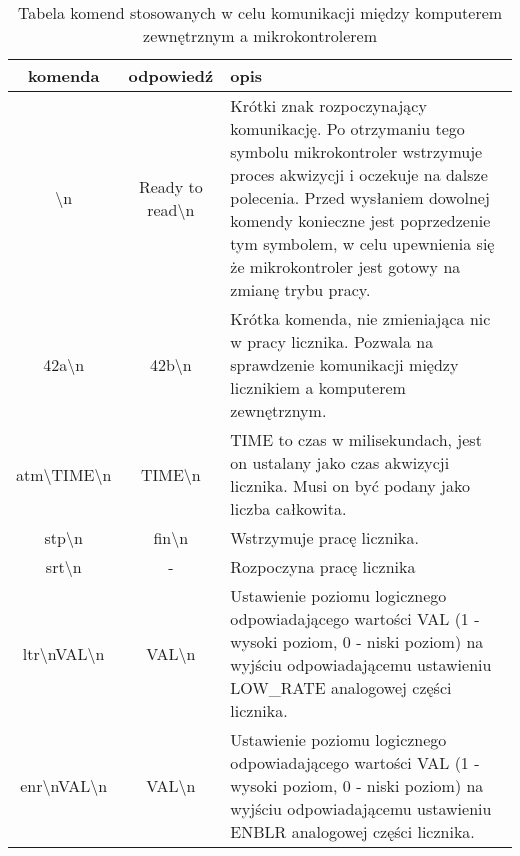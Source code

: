 \begin{table}
        \centering
        \caption{Tabela komend stosowanych w celu komunikacji między komputerem zewnętrznym a mikrokontrolerem}
        \label{komunikacja}
        \begin{tabularx}{\textwidth}{|c|c|X|}
                \hline
                komenda & odpowiedź & opis \\ \hline

                \textbackslash n & Ready to read\textbackslash n & 
                Krótki znak rozpoczynający komunikację.
                Po otrzymaniu tego symbolu mikrokontroler wstrzymuje proces akwizycji i oczekuje na dalsze polecenia.
                Przed wysłaniem dowolnej komendy konieczne jest poprzedzenie tym symbolem, w celu upewnienia się że mikrokontroler jest gotowy na zmianę trybu pracy.
                \\ \hline

                42a\textbackslash n & 42b\textbackslash n& Krótka komenda, nie zmieniająca nic w pracy licznika. Pozwala na sprawdzenie komunikacji między licznikiem a komputerem zewnętrznym. \\ \hline

                atm\textbackslash TIME\textbackslash n & TIME\textbackslash n& TIME to czas w milisekundach, jest on ustalany jako czas akwizycji licznika. Musi on być podany jako liczba całkowita.\\ \hline

                stp\textbackslash n& fin\textbackslash n& Wstrzymuje pracę licznika. \\ \hline

                srt\textbackslash n& - & Rozpoczyna pracę licznika \\ \hline

                ltr\textbackslash nVAL\textbackslash n& VAL\textbackslash n & Ustawienie poziomu logicznego odpowiadającego wartości VAL (1 - wysoki poziom, 0 - niski poziom) na wyjściu odpowiadającemu ustawieniu LOW\_RATE analogowej części licznika. \\ \hline
                
                enr\textbackslash nVAL\textbackslash n& VAL\textbackslash n & Ustawienie poziomu logicznego odpowiadającego wartości VAL (1 - wysoki poziom, 0 - niski poziom) na wyjściu odpowiadającemu ustawieniu ENBLR analogowej części licznika. \\ \hline

        \end{tabularx}
\end{table}

